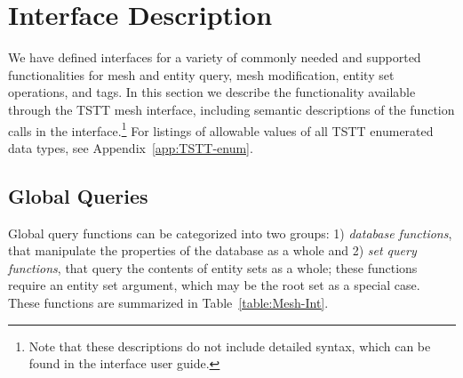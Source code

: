
\section{Interface Description\label{sec:Interface}}

We have defined interfaces for a variety of commonly needed and
supported functionalities for mesh and entity query, mesh modification,
entity set operations, and tags.  In this section we describe the
functionality available through the TSTT mesh interface, including
semantic descriptions of the function calls in the
interface.\footnote{Note that these descriptions do not include detailed
syntax, which can be found in the interface user guide\cite{TSTTB-UG,TSTTM-UG}.}
For listings of allowable values of all TSTT enumerated data types,
see Appendix~\ref{app:TSTT-enum}.

\subsection{Global Queries\label{sub:Mesh-Interface}}

Global query functions can be categorized into two groups: 1)
\emph{database functions}, that manipulate the properties of the
database as a whole and 2) \emph{set query functions}, that query the
contents of entity sets as a whole; these functions require an entity
set argument, which may be the root set as a special case.  These
functions are summarized in Table~\ref{table:Mesh-Int}.

